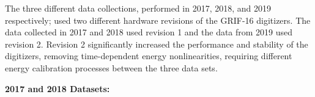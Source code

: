 \documentclass[cnatzke_thesis_proposal.tex]{subfiles}
\begin{document}
The three different data collections, performed in 2017, 2018, and 2019 respectively; used two different hardware revisions of the GRIF-16 digitizers. 
The data collected in 2017 and 2018 used revision 1 and the data from 2019 used revision 2. 
Revision 2 significantly increased the performance and stability of the digitizers, removing time-dependent energy nonlinearities, requiring different energy calibration processes between the three data sets. 

\textbf{2017 and 2018 Datasets:} 




\end{document}

